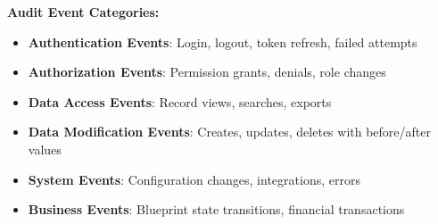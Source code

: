 \textbf{Audit Event Categories:}

\begin{itemize}
  \item \textbf{Authentication Events}: Login, logout, token refresh, failed attempts
  \item \textbf{Authorization Events}: Permission grants, denials, role changes
  \item \textbf{Data Access Events}: Record views, searches, exports
  \item \textbf{Data Modification Events}: Creates, updates, deletes with before/after values
  \item \textbf{System Events}: Configuration changes, integrations, errors
  \item \textbf{Business Events}: Blueprint state transitions, financial transactions
\end{itemize}

